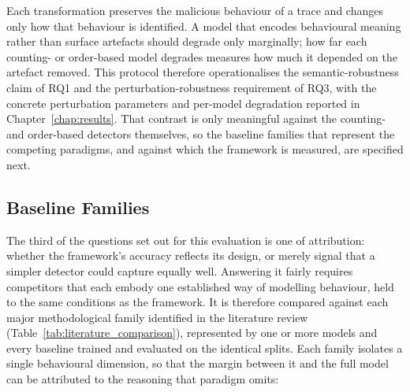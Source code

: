\documentclass[%
    BCOR=10mm,
    DIV=13,
    toc=bibliography,
    toc=listof,
    oneside,
    12pt,
]{scrbook}
\begin{document}
Each transformation preserves the malicious behaviour of a trace and changes
only how that behaviour is identified. A model that encodes behavioural meaning
rather than surface artefacts should degrade only marginally; how far each
counting- or order-based model degrades measures how much it depended on the
artefact removed. This protocol therefore
operationalises the semantic-robustness claim of RQ1 and the
perturbation-robustness requirement of RQ3, with the concrete perturbation
parameters and per-model degradation reported in Chapter~\ref{chap:results}.
That contrast is only meaningful against the counting- and order-based detectors
themselves, so the baseline families that represent the competing paradigms, and
against which the framework is measured, are specified next.

\subsection{Baseline Families}
\label{subsec:baselines}

The third of the questions set out for this evaluation is one of attribution:
whether the framework's accuracy reflects its design, or merely signal that a
simpler detector could capture equally well. Answering it fairly requires
competitors that each embody one established way of modelling behaviour, held to
the same conditions as the framework. It is therefore compared against each
major methodological family identified in the literature review
(Table~\ref{tab:literature_comparison}), represented by one or more models and
every baseline trained and evaluated on the identical splits. Each family
isolates a single behavioural dimension, so that the margin between it and the
full model can be attributed to the reasoning that paradigm omits:
\end{document}
